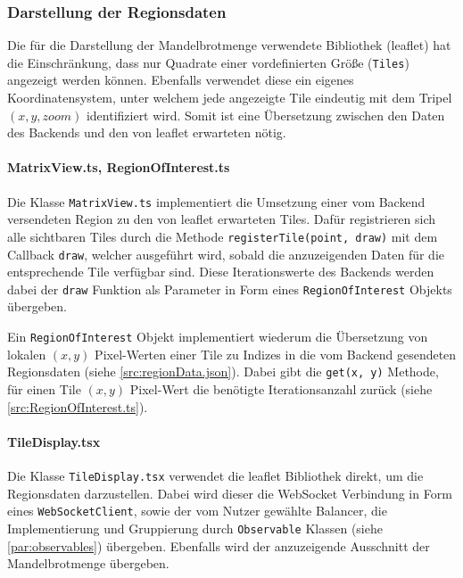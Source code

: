 \subsubsection{Darstellung der Regionsdaten} %

Die für die Darstellung der Mandelbrotmenge verwendete Bibliothek (leaflet) hat die Einschränkung, dass 
nur Quadrate einer vordefinierten Größe (\verb|Tiles|) angezeigt werden können. Ebenfalls verwendet diese ein 
eigenes Koordinatensystem, unter welchem jede angezeigte Tile eindeutig mit dem Tripel \( (x, y, zoom) \)
identifiziert wird. Somit ist eine Übersetzung zwischen den Daten des Backends und den von leaflet erwarteten nötig.

\paragraph{MatrixView.ts, RegionOfInterest.ts} \label{par:matrixView}
Die Klasse \verb|MatrixView.ts| implementiert die Umsetzung einer vom Backend versendeten Region zu
den von leaflet erwarteten Tiles. Dafür registrieren sich alle sichtbaren Tiles durch die Methode
\verb|registerTile(point, draw)| mit dem Callback \verb|draw|, welcher ausgeführt wird, sobald die anzuzeigenden Daten für die 
entsprechende Tile verfügbar sind. Diese Iterationswerte des Backends werden dabei der \verb|draw| Funktion als Parameter
in Form eines \verb|RegionOfInterest| Objekts übergeben. 

Ein \verb|RegionOfInterest| Objekt implementiert wiederum die Übersetzung von lokalen \( (x,y) \) Pixel-Werten
einer Tile zu Indizes in die vom Backend gesendeten Regionsdaten (siehe \autoref{src:regionData.json}). Dabei gibt die 
\verb|get(x, y)| Methode, für einen Tile \( (x,y) \) Pixel-Wert die benötigte Iterationsanzahl zurück (siehe \autoref{src:RegionOfInterest.ts}).

\begin{figure}[h!]
	
\end{figure}

\paragraph{TileDisplay.tsx}
Die Klasse \verb|TileDisplay.tsx| verwendet die leaflet Bibliothek direkt, um die Regionsdaten darzustellen.
Dabei wird dieser die WebSocket Verbindung in Form eines \verb|WebSocketClient|, sowie der vom Nutzer gewählte Balancer, 
die Implementierung und Gruppierung durch \verb|Observable| Klassen (siehe \autoref{par:observables}) übergeben. Ebenfalls wird der anzuzeigende Ausschnitt der 
Mandelbrotmenge übergeben.

